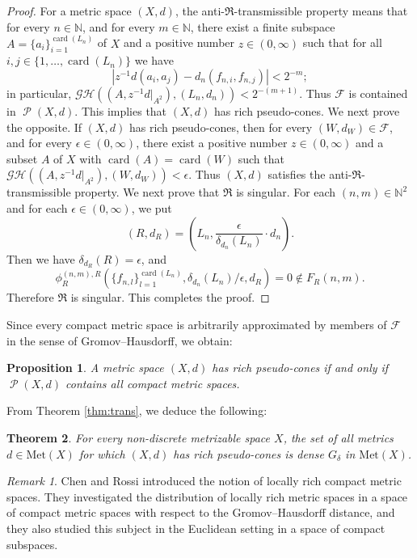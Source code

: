 \documentclass[a4paper, 12pt]{amsart}
\theoremstyle{plain}
\newtheorem{thm}{Theorem}[section]
\newtheorem{prop}[thm]{Proposition}
\theoremstyle{definition}
\theoremstyle{remark}
\newtheorem{rmk}{Remark}[section]
\newcommand{\nn}{\mathbb{N}}
\DeclareMathOperator{\card}{card}
\DeclareMathOperator{\pc}{\mathscr{P}}
\newcommand{\met}[1]{\mathrm{Met}(#1)}
\begin{document}
\begin{proof}
For a metric space 
$(X, d)$, 
the 
anti-$\mathfrak{R}$-transmissible property means that 
for every 
$n\in \nn$, 
and for every 
$m\in \nn$, 
there exist 
a finite subspace 
$A=\{a_{i}\}_{i=1}^{\card(L_{n})}$ 
of 
$X$ 
and a positive number 
$z\in (0, \infty)$ 
such that for all 
$i, j\in \{1, \dots, \card(L_{n})\}$ 
we have 
\[
	|z^{-1}d(a_{i}, a_{j})-d_{n}(f_{n,i}, f_{n, j})|<2^{-m};
\]
in particular, 
$\mathcal{GH}((A, z^{-1}d|_{A^{2}}), (L_{n}, d_{n}))<2^{-(m+1)}$. 
Thus 
$\mathscr{F}$ 
is contained in 
$\pc(X, d)$. 
This implies that 
$(X, d)$ 
has rich pseudo-cones. 
We next prove the opposite. 
If 
$(X, d)$ 
has rich pseudo-cones,  
then for every 
$(W, d_{W})\in \mathscr{F}$, 
and for every 
$\epsilon\in (0, \infty)$, 
there exist a positive number 
$z\in (0, \infty)$ 
and  a subset 
$A$ 
of
 $X$ 
 with 
$\card(A)=\card(W)$ such that 
$\mathcal{GH}((A, z^{-1}d|_{A^{2}}), (W, d_{W}))<\epsilon$. 
Thus 
$(X, d)$ 
satisfies the
 anti-$\mathfrak{R}$-transmissible property. 
We next prove that 
$\mathfrak{R}$ 
is singular. 
For each 
$(n, m)\in \nn^{2}$ 
and for each 
$\epsilon\in (0, \infty)$, 
we put 
\[
	(R, d_{R})=\left(L_{n}, \frac{\epsilon}{\delta_{d_{n}}(L_{n})}\cdot d_{n}\right).
\]
Then we have 
$\delta_{d_{R}}(R)=\epsilon$,  
and 
\[
	\phi_R^{(n, m), R}
	\left(
	\{f_{n, l}\}_{l=1}^{\card(L_{n})}, \delta_{d_{n}}(L_{n})/\epsilon, d_{R} 
	\right)
	=
	0
	\not\in F_{R}(n, m). 
\] 
Therefore 
$\mathfrak{R}$
 is singular. 
This completes the proof. 
\end{proof}




Since every compact metric space is arbitrarily approximated by 
members of 
$\mathscr{F}$
 in the sense of Gromov--Hausdorff, 
we obtain: 
\begin{prop}
A metric space 
$(X, d)$ 
has rich pseudo-cones 
if and only if 
$\pc(X, d)$ 
contains all compact metric spaces.  
\end{prop}




From Theorem
 \ref{thm:trans},  
we deduce the following:
\begin{thm}\label{thm:richcones}
For every
non-discrete 
 metrizable space 
$X$,  
the set of all metrics 
$d\in \met{X}$ 
for which 
$(X, d)$ 
has rich pseudo-cones is dense 
$G_{\delta}$ 
in 
$\met{X}$. 
\end{thm}




\begin{rmk}
Chen and Rossi 
\cite{MR3395963}
 introduced the notion of locally rich compact metric spaces. 
 They investigated the distribution of locally rich metric spaces in a space of  compact metric spaces with respect to the Gromov--Hausdorff distance, 
 and they also studied this subject in the Euclidean setting in a space of compact subspaces. 
\end{rmk}
\end{document}
